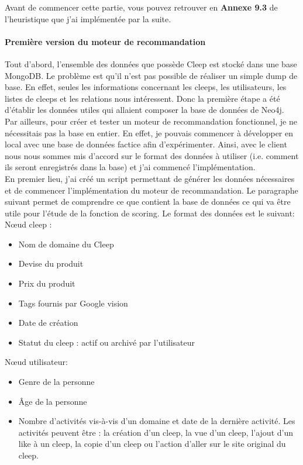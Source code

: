 \documentclass{article} %
\begin{document}
Avant de commencer cette partie, vous pouvez retrouver en \textbf{Annexe 9.3} de l'heuristique que j'ai implémentée par la suite. 

\paragraph{Première version du moteur de recommandation\\}
Tout d'abord, l'ensemble des données que possède Cleep est stocké dans une base MongoDB. Le problème est qu'il n'est pas possible de réaliser un simple dump de base. En effet, seules les informations concernant les cleeps, les utilisateurs, les listes de cleeps et les relations nous intéressent. Donc la première étape a été d'établir les données utiles qui allaient composer la base de données de Neo4j.\\
Par ailleurs, pour créer et tester un moteur de recommandation fonctionnel, je ne nécessitais pas la base en entier. En effet, je pouvais commencer à développer en local avec une base de données factice afin d'expérimenter. Ainsi, avec le client nous nous sommes mis d'accord sur le format des données à utiliser (i.e. comment ils seront enregistrés dans la base) et j'ai commencé l'implémentation.\\
En premier lieu, j'ai créé un script permettant de générer les données nécessaires et de commencer l'implémentation du moteur de recommandation. Le paragraphe suivant permet de comprendre ce que contient la base de données ce qui va être utile pour l'étude de la fonction de scoring. Le format des données est le suivant:\\
Nœud cleep :
\begin{itemize}
 \item Nom de domaine du Cleep
 \item Devise du produit
 \item Prix du produit
 \item Tags fournis par Google vision
 \item Date de création
 \item Statut du cleep : actif ou archivé par l'utilisateur
\end{itemize}

Nœud utilisateur:
\begin{itemize}
 \item Genre de la personne
 \item Âge de la personne
 \item Nombre d'activités vis-à-vis d'un domaine et date de la dernière activité. Les activités peuvent être : la création d'un cleep, la vue d'un cleep, l'ajout d'un like à un cleep, la copie d'un cleep ou l'action d'aller sur le site original du cleep. 
\end{itemize}
\end{document}
